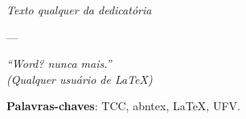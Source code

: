 \documentclass[
	12pt,				    %
	openright,			    %
	oneside,			    %
	a4paper,			    %
    sumario=tradicional,    %
	english,			    %
	brazil,				    %
	]{abntex2}
\begin{document}
\frenchspacing

\pretextual

\imprimircapa

\imprimirfolhaderosto

\imprimirfolhadeaprovacao

\begin{dedicatoria}
   \vspace*{\fill}
   \centering
   \noindent
   \textit{Texto qualquer da dedicatória}
   \vspace*{\fill}
\end{dedicatoria}

\begin{agradecimentos}
\end{agradecimentos}
 ---

\begin{epigrafe}
    \vspace*{\fill}
	\begin{flushright}
		\textit{``Word? nunca mais.''\\
		(Qualquer usuário de \LaTeX)}
	\end{flushright}
\end{epigrafe}


\begin{resumo}
 \noindent

 \vspace{\onelineskip}

 \noindent
 \textbf{Palavras-chaves}: TCC, abntex, LaTeX, UFV.
\end{resumo}

%
%

\listoffigures*
\cleardoublepage
\end{document}
